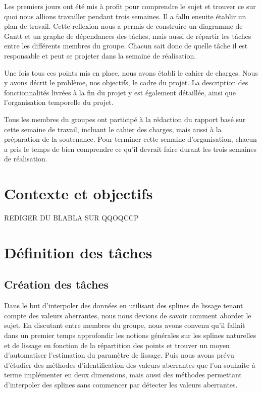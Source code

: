 \documentclass[a4paper,10pt]{article} %
\begin{document}
Les premiers jours ont été mis à profit pour comprendre le sujet et trouver ce sur quoi nous allions travailler pendant trois semaines. Il a fallu ensuite établir un plan de travail. Cette reflexion nous a permis de construire un diagramme de Gantt et un graphe de dépendances des tâches, mais aussi de répartir les tâches entre les différents membres du groupe. Chacun sait donc de quelle tâche il est responsable et peut se projeter dans la semaine de réalisation.

Une fois tous ces points mis en place, nous avons établi le cahier de charges. Nous y avons décrit le problème, nos objectifs, le cadre du projet. La description des fonctionnalités livrées à la fin du projet y est également détaillée, ainsi que l'organisation temporelle du projet. 

Tous les membres du groupes ont participé à la rédaction du rapport basé sur cette semaine de travail, incluant le cahier des charges, mais aussi à la préparation de la soutenance. Pour terminer cette semaine d'organisation, chacun a pris le temps de bien comprendre ce qu'il devrait faire durant les trois semaines de réalisation. 
\newpage
\section{Contexte et objectifs}
	REDIGER DU BLABLA SUR QQOQCCP

\section{Définition des tâches}

	\subsection{Création des tâches}
	Dans le but d'interpoler des données en utilisant des splines de lissage tenant compte des valeurs aberrantes, nous nous devions de savoir comment aborder le sujet. En discutant entre membres du groupe, nous avons convenu qu'il fallait dans un premier temps approfondir les notions générales sur les splines naturelles et de lissage en fonction de la répartition des points et trouver un moyen d'automatiser l'estimation du paramètre de lissage. Puis nous avons prévu d'étudier des méthodes d'identification des valeurs aberrantes que l'on souhaite à terme implémenter en deux dimensions, mais aussi des méthodes permettant d'interpoler des splines sans commencer par détecter les valeurs aberrantes.
\newpage
\end{document}
